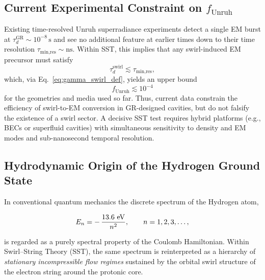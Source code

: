 \documentclass[10pt,reprint,aps,onecolumn,nofootinbib]{revtex4-2}
\begin{document}
    \subsection{Current Experimental Constraint on $f_{\text{Unruh}}$}

        Existing time-resolved Unruh superradiance experiments
        \cite{Lochan2020,WangBlencowe2021,Deswal2025,Zheng2025,Saha2025} detect a
        single EM burst at $\tau_d^{\text{GR}}\sim10^{-8}\,\mathrm{s}$ and see no
        additional feature at earlier times down to their time resolution
        $\tau_{\text{min,res}}\sim \mathrm{ns}$. Within SST, this implies that any
        swirl-induced EM precursor must satisfy
        \begin{equation}
            \tau_d^{\text{swirl}} \lesssim \tau_{\text{min,res}},
        \end{equation}
        which, via Eq.~\eqref{eq:gamma_swirl_def}, yields an upper bound
        \begin{equation}
            f_{\text{Unruh}} \lesssim 10^{-4}
        \end{equation}
        for the geometries and media used so far. Thus, current data constrain the
        efficiency of swirl-to-EM conversion in GR-designed cavities, but do not
        falsify the existence of a swirl sector. A decisive SST test requires
        hybrid platforms (e.g., BECs or superfluid cavities) with simultaneous
        sensitivity to density and EM modes \cite{Steinhauer2016,Gooding2020} and
        sub-nanosecond temporal resolution.

    \subsection{Hydrodynamic Origin of the Hydrogen Ground State}
        \label{sec:SST_hydrogen_groundstate}

        In conventional quantum mechanics the discrete spectrum of the Hydrogen
        atom,

        \begin{equation}
            E_n = -\,\frac{13.6~{\rm eV}}{n^2},
            \qquad n=1,2,3,\ldots,
        \end{equation}

        is regarded as a purely spectral property of the Coulomb Hamiltonian.
        Within Swirl--String Theory (SST), the same spectrum is reinterpreted as
        a hierarchy of \emph{stationary incompressible flow regimes} sustained
        by the orbital swirl structure of the electron string around the
        protonic core.
\end{document}
